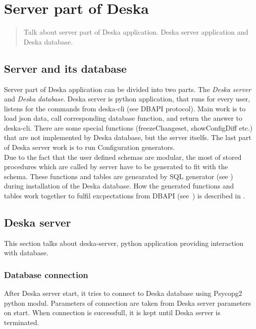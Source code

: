 \documentclass[deska]{subfiles}
\begin{document}
\chapter{Server part of Deska}
\label{sec:deska-server}

\begin{abstract}
Talk about server part of Deska application. Deska server application and Deska database.
\end{abstract}

\section{Server and its database}
Server part of Deska application can be divided into two parts. The {\em Deska server} and {\em Deska database}.
Deska server is python application, that runs for every user, listens for the commands from deska-cli (see DBAPI protocol).
Main work is to load json data, call corresponding database function, and return the answer to deska-cli.
There are some special functions (freezeChangeset, showConfigDiff etc.) that are not implemented by Deska database, but the server itselfs.
The last part of Deska server work is to run Configuration generators.\\
Due to the fact that the user defined schemas are modular, the most of stored procedures which are called by server have to be generated to fit with the schema.
These functions and tables are genearated by SQL generator (see ) during installation of the Deska database. How the generated functions and tables work together to fulfil excpectations from DBAPI (see~) is described in .

\section{Deska server}
\label{sec:server-py}

This section talks about deska-server, python application providing interaction with database.


\subsection{Database connection}
After Deska server start, it tries to connect to Deska database using Psycopg2 python modul.
Parameters of connection are taken from Deska server parameters on start.
When connection is successfull, it is kept until Deska server is terminated.
\end{document}

